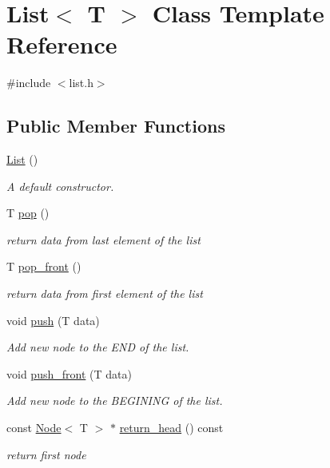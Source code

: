 \hypertarget{class_list}{}\section{List$<$ T $>$ Class Template Reference}
\label{class_list}


{\ttfamily \#include $<$list.\+h$>$}

\subsection*{Public Member Functions}
\begin{DoxyCompactItemize}
\item 
\hyperlink{class_list_a5c5e27671b21b3815d4e25b953c69454}{List} ()
\begin{DoxyCompactList}\small\item\em A default constructor. \end{DoxyCompactList}\item 
T \hyperlink{class_list_ad19661456bd18843dfe970b5309e7516}{pop} ()
\begin{DoxyCompactList}\small\item\em return data from last element of the list \end{DoxyCompactList}\item 
T \hyperlink{class_list_a7fcb48a6742a21eb3f6666018b3edb20}{pop\+\_\+front} ()
\begin{DoxyCompactList}\small\item\em return data from first element of the list \end{DoxyCompactList}\item 
void \hyperlink{class_list_a7aedb99ebfb318e7e847ab80a1c0207c}{push} (T data)
\begin{DoxyCompactList}\small\item\em Add new node to the E\+N\+D of the list. \end{DoxyCompactList}\item 
void \hyperlink{class_list_ac7612ccf36cd935d4cc10a59ceab14d7}{push\+\_\+front} (T data)
\begin{DoxyCompactList}\small\item\em Add new node to the B\+E\+G\+I\+N\+I\+N\+G of the list. \end{DoxyCompactList}\item 
const \hyperlink{class_node}{Node}$<$ T $>$ $\ast$ \hyperlink{class_list_a1fd3d5197baa65c12c3217b1e406e7f3}{return\+\_\+head} () const 
\begin{DoxyCompactList}\small\item\em return first node \end{DoxyCompactList}\item 

\end{DoxyCompactItemize}
